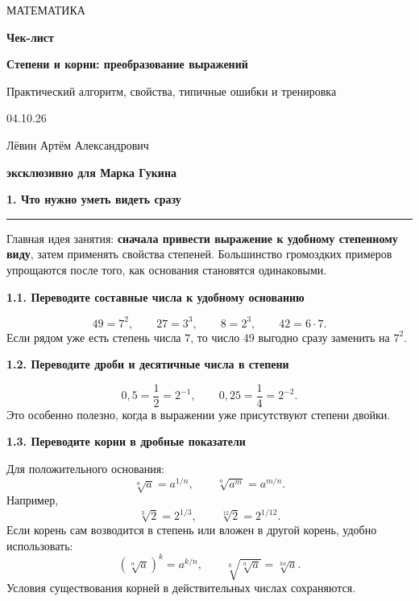 \documentclass[a4paper,12pt]{article}
\newcommand{\sectionline}{\par\vspace{2pt}\noindent\color{rulegray}\rule{\linewidth}{0.5pt}\color{textgray}\par\vspace{5pt}}
\newcommand{\formula}[1]{\[\displaystyle #1\]}
\newcommand{\markrule}[1]{\textcolor{accent}{\textbf{#1}}}
\newcommand{\exhead}[1]{\par\medskip\textcolor{darkaccent}{\textbf{#1}}\par}
\begin{document}
\thispagestyle{empty}
\begin{center}
\vspace*{20mm}
{\color{softgray}\large МАТЕМАТИКА}\par
\vspace{12mm}
{\fontsize{29}{34}\selectfont\bfseries\color{darkaccent} Чек-лист}\par
\vspace{5mm}
{\fontsize{20}{25}\selectfont\bfseries Степени и корни: преобразование выражений}\par
\vspace{12mm}
{\large Практический алгоритм, свойства, типичные ошибки и тренировка}\par
\vfill
{\large 04.10.26}\par
\vspace{7mm}
{\normalsize Лёвин Артём Александрович}\par
{\normalsize\bfseries эксклюзивно для Марка Гукина}\par
\vspace{12mm}
\end{center}


\clearpage

{\LARGE\bfseries\color{darkaccent}1. Что нужно уметь видеть сразу}\par
\sectionline

Главная идея занятия: \markrule{сначала привести выражение к удобному степенному виду}, затем применять свойства степеней. Большинство громоздких примеров упрощаются после того, как основания становятся одинаковыми.

\exhead{1.1. Переводите составные числа к удобному основанию}
\formula{49=7^2,\qquad 27=3^3,\qquad 8=2^3,\qquad 42=6\cdot 7.}
Если рядом уже есть степень числа $7$, то число $49$ выгодно сразу заменить на $7^2$.

\exhead{1.2. Переводите дроби и десятичные числа в степени}
\formula{0{,}5=\frac12=2^{-1},\qquad 0{,}25=\frac14=2^{-2}.}
Это особенно полезно, когда в выражении уже присутствуют степени двойки.

\exhead{1.3. Переводите корни в дробные показатели}
Для положительного основания:
\formula{\sqrt[n]{a}=a^{1/n},\qquad \sqrt[n]{a^m}=a^{m/n}.}
Например,
\formula{\sqrt[3]{2}=2^{1/3},\qquad \sqrt[12]{2}=2^{1/12}.}
Если корень сам возводится в степень или вложен в другой корень, удобно использовать:
\formula{(\sqrt[n]{a})^k=a^{k/n},\qquad \sqrt[k]{\sqrt[n]{a}}=\sqrt[kn]{a}.}
Условия существования корней в действительных числах сохраняются.
\end{document}
